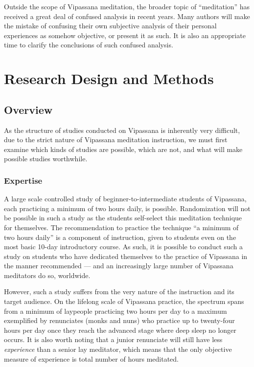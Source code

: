 \documentclass[a4paper, amsfonts, amssymb, amsmath, reprint, showkeys, nofootinbib, twoside]{revtex4-1}
\begin{document}
Outside the scope of Vipassana meditation, the broader topic of
``meditation'' has received a great deal of confused analysis in
recent years.
Many authors will make the mistake of confusing their own subjective
analysis of their personal experiences as somehow objective, or
present it as such.
\cite{ingram2020mastering,https://doi.org/10.1007/s12671-020-01389-4}
It is also an appropriate time to clarify the conclusions of such
confused analysis.

\section{Research Design and Methods}

\subsection{Overview}

As the structure of studies conducted on Vipassana is inherently very difficult, due to
the strict nature of Vipassana meditation instruction, we must first examine which kinds of
studies are possible, which are not, and what will make possible studies worthwhile.

\subsubsection{Expertise}

A large scale controlled study of beginner-to-intermediate
students of Vipassana, each practicing a minimum of two hours daily, is
possible. Randomization will not be possible in such a study as the students
self-select this meditation technique for themselves. The recommendation to practice
the technique ``a minimum of two hours daily'' is a component of instruction, given
to students even on the most basic 10-day introductory
course. \cite{dhammaorg2017guidelines,goenka2001importance} As such, it is possible
to conduct such a study on students who have dedicated themselves to the practice of
Vipassana in the manner recommended --- and an increasingly large number of Vipassana
meditators do so, worldwide.

However, such a study suffers from the very nature of
the instruction and its target audience. On the lifelong scale of Vipassana
practice, the spectrum spans from a minimum of laypeople practicing two hours per day to
a maximum exemplified by renunciates (monks and nuns) who practice up to twenty-four
hours per day once they
reach the advanced stage where deep sleep no longer occurs. It is
also worth noting that a junior renunciate will still have less \textit{experience}
than a senior lay meditator, which means that the only objective measure of
experience is total number of hours meditated. \cite{goleman2017altered}
\end{document}

